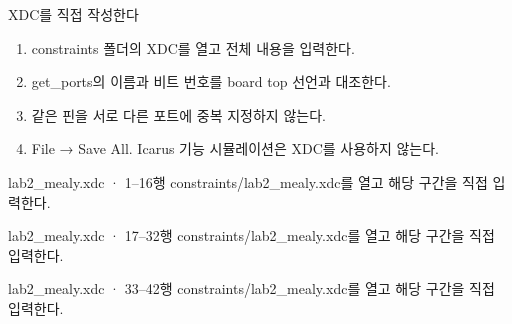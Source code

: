 \begin{frame}{XDC를 직접 작성한다}
\small
\begin{enumerate}
\item constraints 폴더의 XDC를 열고 전체 내용을 입력한다.
\item get\_ports의 이름과 비트 번호를 board top 선언과 대조한다.
\item 같은 핀을 서로 다른 포트에 중복 지정하지 않는다.
\item File → Save All. Icarus 기능 시뮬레이션은 XDC를 사용하지 않는다.
\end{enumerate}
\end{frame}

\begin{frame}{lab2\_mealy.xdc · 1–16행}
\small
constraints/lab2\_mealy.xdc를 열고 해당 구간을 직접 입력한다.\par\vspace{0.4cm}\par\vspace{0.4cm}
\end{frame}

\begin{frame}{lab2\_mealy.xdc · 17–32행}
\small
constraints/lab2\_mealy.xdc를 열고 해당 구간을 직접 입력한다.\par\vspace{0.4cm}\par\vspace{0.4cm}
\end{frame}

\begin{frame}{lab2\_mealy.xdc · 33–42행}
\small
constraints/lab2\_mealy.xdc를 열고 해당 구간을 직접 입력한다.\par\vspace{0.4cm}\par\vspace{0.4cm}
\end{frame}

